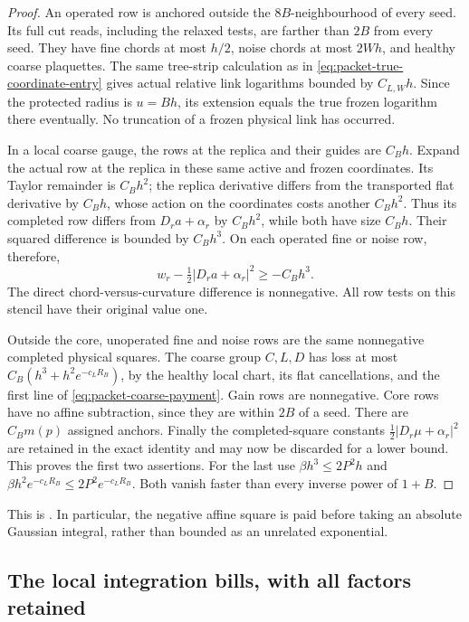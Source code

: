 \documentclass[11pt,reqno]{amsart}
\numberwithin{equation}{section}
\theoremstyle{definition}
\theoremstyle{remark}
\begin{document}
\begin{proof}
An operated row is anchored outside the \(8B\)-neighbourhood
of every seed. Its full cut reads, including the relaxed tests,
are farther than \(2B\) from every seed. They have fine chords
at most \(h/2\), noise chords at most \(2Wh\), and healthy
coarse plaquettes. The same tree-strip calculation as in
\eqref{eq:packet-true-coordinate-entry} gives actual relative
link logarithms bounded by \(C_{L,W}h\). Since the protected
radius is \(u=Bh\), its extension equals the true frozen
logarithm there eventually. No truncation of a frozen physical
link has occurred.

In a local coarse gauge, the rows at the replica and their
guides are \(C_Bh\). Expand the actual row at the replica in
these same active and frozen coordinates. Its Taylor remainder
is \(C_Bh^2\); the replica derivative differs from the
transported flat derivative by \(C_Bh\), whose action on the
coordinates costs another \(C_Bh^2\). Thus its completed row
differs from \(D_ra+\alpha_r\) by \(C_Bh^2\), while both
have size \(C_Bh\). Their squared difference is bounded by
\(C_Bh^3\). On each operated fine or noise row, therefore,
\[
                  w_r-\tfrac12|D_ra+\alpha_r|^2\ge-C_Bh^3.
\]
The direct chord-versus-curvature difference is nonnegative.
All row tests on this stencil have their original value one.

Outside the core, unoperated fine and noise rows are the same
nonnegative completed physical squares. The coarse group
\(C,L,D\) has loss at most \(C_B(h^3+h^2e^{-c_LR_B})\),
by the healthy local chart, its flat cancellations, and the
first line of \eqref{eq:packet-coarse-payment}. Gain rows
are nonnegative. Core rows have no affine subtraction, since
they are within \(2B\) of a seed. There are \(C_Bm(p)\)
assigned anchors. Finally the completed-square constants
\(\frac12|D_r\mu+\alpha_r|^2\) are retained in the exact
identity and may now be discarded for a lower bound.
This proves the first two assertions.
For the last use \(\beta h^3\le2P^2h\) and
\(\beta h^2e^{-c_LR_B}\le2P^2e^{-c_LR_B}\). Both vanish
faster than every inverse power of \(1+B\).
\end{proof}

This is \cite[Lemma~30.7, pp.~181--182]{Main}. In particular,
the negative affine square is paid before taking an absolute
Gaussian integral, rather than bounded as an unrelated
exponential.

\subsection{The local integration bills, with all factors retained}
\end{document}
